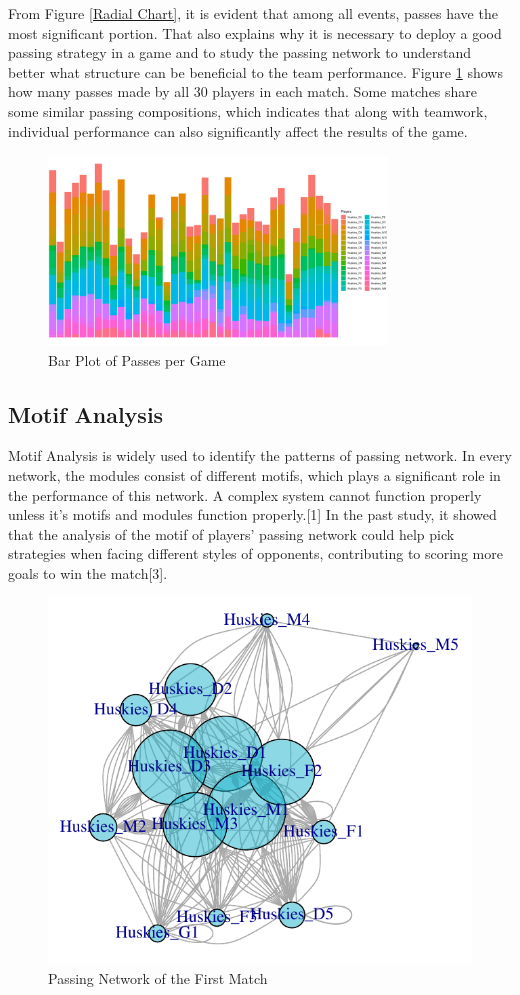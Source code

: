 \documentclass{mcmthesis}
\begin{document}
From Figure \ref{Radial Chart}, it is evident that among all events, passes have the most significant portion. That also explains why it is necessary to deploy a good passing strategy in a game and to study the passing network to understand better what structure can be beneficial to the team performance. Figure \ref{Bar Plot of Passes per Game} shows how many passes made by all 30 players in each match. Some matches share some similar passing compositions, which indicates that along with teamwork, individual performance can also significantly affect the results of the game.

\begin{figure}[h!]
\begin{center}
\includegraphics[width=0.8\textwidth]{F2.pdf}
\caption{Bar Plot of Passes per Game}\label{Bar Plot of Passes per Game}
\end{center}
\end{figure}

\subsection{Motif Analysis}
Motif Analysis is widely used to identify the patterns of passing network. In every network, the modules consist of different motifs, which plays a significant role in the performance of this network. A complex system cannot function properly unless it’s motifs and modules function properly.[1] In the past study, it showed that the analysis of the motif of players’ passing network could help pick strategies when facing different styles of opponents, contributing to scoring more goals to win the match[3].

\begin{figure}[h!]
\begin{center}
\includegraphics[width=.5\textwidth]{F3fixed.pdf}
\caption{Passing Network of the First Match}
\end{center}
\end{figure}
\end{document}
